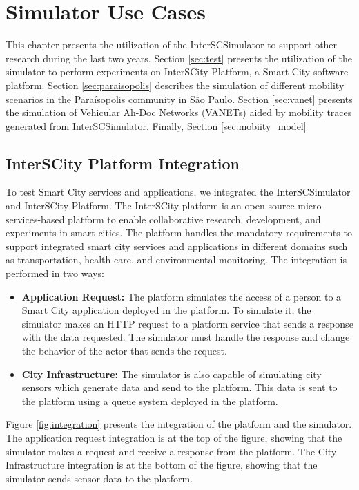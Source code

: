 \chapter{Simulator Use Cases}
\label{cap:uses}

This chapter presents the utilization of the InterSCSimulator to support other research during the last two years. Section \ref{sec:test} presents the utilization of the simulator to perform experiments on InterSCity Platform, a Smart City software platform. Section \ref{sec:paraisopolis} describes the simulation of different mobility scenarios in the Paraísopolis community in S\~ao Paulo. Section \ref{sec:vanet} presents the simulation of Vehicular Ah-Doc Networks (VANETs) aided by mobility traces generated from InterSCSimulator. Finally, Section \ref{sec:mobiity_model}

\section{InterSCity Platform Integration}

To test Smart City services and applications, we integrated the InterSCSimulator and InterSCity Platform. The InterSCity platform is an open source micro-services-based platform to enable collaborative research, development, and experiments in smart cities. The platform handles the mandatory requirements to support integrated smart city services and applications in different domains such as transportation, health-care, and environmental monitoring. The integration is performed in two ways:

\begin{itemize}

\item \textbf{Application Request: } The platform simulates the access of a person to a Smart City application deployed in the platform. To simulate it, the simulator makes an HTTP request to a platform service that sends a response with the data requested. The simulator must handle the response and change the behavior of the actor that sends the request.

\item \textbf{City Infrastructure: } The simulator is also capable of simulating city sensors which generate data and send to the platform. This data is sent to the platform using a queue system deployed in the platform.

\end{itemize}

Figure \ref{fig:integration} presents the integration of the platform and the simulator. The application request integration is at the top of the figure, showing that the simulator makes a request and receive a response from the platform. The City Infrastructure integration is at the bottom of the figure, showing that the simulator sends sensor data to the platform.

